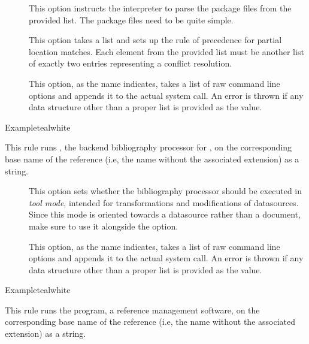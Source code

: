 \begin{description}
\begin{description}
\item[] This option instructs the interpreter to parse the package files from the provided list. The package files need to be quite simple.

\item[] This option takes a list and sets up the rule of precedence for partial location matches. Each element from the provided list must be another list of exactly two entries representing a conflict resolution.

\item[] This option, as the name indicates, takes a list of raw command line options and appends it to the actual system call. An error is thrown if any data structure other than a proper list is provided as the value.
\end{description}

\begin{codebox}{Example}{teal}{\icnote}{white}
\end{codebox}

\item[\rulebox{biber}]
This rule runs , the backend bibliography processor for , on the corresponding base name of the  reference (i.e, the name without the associated extension) as a string.

\begin{description}
\item[]  This option sets whether the bibliography processor should be executed in \emph{tool mode}, intended for transformations and modifications of datasources. Since this mode is oriented towards a datasource rather than a document, make sure to use it alongside the  option. 

\item[] This option, as the name indicates, takes a list of raw command line options and appends it to the actual system call. An error is thrown if any data structure other than a proper list is provided as the value.
\end{description}

\begin{codebox}{Example}{teal}{\icnote}{white}
\end{codebox}

\item[\rulebox{bibtex}]
This rule runs the  program, a reference management software, on the corresponding base name of the  reference (i.e, the name without the associated extension) as a string.


\end{description}
